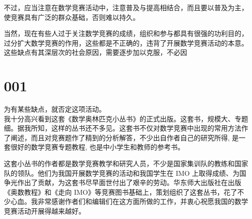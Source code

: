 \documentclass[10pt]{article}
\begin{document}
不过，应当注意在数学竞赛活动中，注意普及与提高相结合，而且要以普及为主，使竞赛具有广泛的群众基础，否则难以持久。

当然，现在有些人过于关注数学竞赛的成绩，组织和参与都具有很强的功利目的，过分扩大数学竞赛的作用，这些都是不正确的，违背了开展数学竞赛活动的本意。这些缺点有其深层次的社会原因，需要逐步加以克服，不必因

\section*{001}
为有某些缺点，就否定这项活动。\\
我十分高兴看到这套《数学奥林匹克小丛书》的正式出版。这套书，规模大、专题细。据我所知，这样的丛书还不多见。这套书不仅对数学竞赛中出现的常用方法作了阐述，而且对竞赛题作了精到的分析解答，不少出自作者自己的研究所得, 是一套很好的数学竞赛专题教程, 也是中小学生和教师的参考书。

这套小丛书的作者都是数学竞赛教学和研究人员，不少是国家集训队的教练和国家队的领队。他们为我国开展数学竞赛的活动和我国学生在 IMO 上取得成绩、为国争光作出了贡献，为这套书尽早面世付出了艰辛的劳动。华东师大出版社在出版《奥数教程》和《走向 IMO》等竞赛图书基础上，策划组织了这套丛书，花了不少心血。我非常感谢作者们和编辑们在这方面所做的工作，并衷心祝愿我国的数学竞赛活动开展得越来越好。
\end{document}
